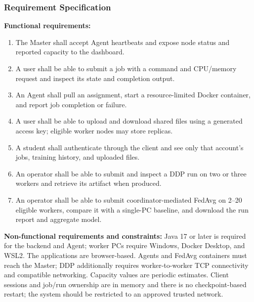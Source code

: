 \documentclass{article}
\begin{document}
	\subsubsection{Requirement Specification}
\textbf{Functional requirements:}
\begin{enumerate}
  \item The Master shall accept Agent heartbeats and expose node status and reported capacity to the dashboard.
  \item A user shall be able to submit a job with a command and CPU/memory request and inspect its state and completion output.
  \item An Agent shall pull an assignment, start a resource-limited Docker container, and report job completion or failure.
  \item A user shall be able to upload and download shared files using a generated access key; eligible worker nodes may store replicas.
  \item A student shall authenticate through the client and see only that account's jobs, training history, and uploaded files.
  \item An operator shall be able to submit and inspect a DDP run on two or three workers and retrieve its artifact when produced.
  \item An operator shall be able to submit coordinator-mediated FedAvg on 2--20 eligible workers, compare it with a single-PC baseline, and download the run report and aggregate model.
\end{enumerate}
\textbf{Non-functional requirements and constraints:} Java 17 or later is required for the backend and Agent; worker PCs require Windows, Docker Desktop, and WSL2. The applications are browser-based. Agents and FedAvg containers must reach the Master; DDP additionally requires worker-to-worker TCP connectivity and compatible networking. Capacity values are periodic estimates. Client sessions and job/run ownership are in memory and there is no checkpoint-based restart; the system should be restricted to an approved trusted network.
\end{document}
